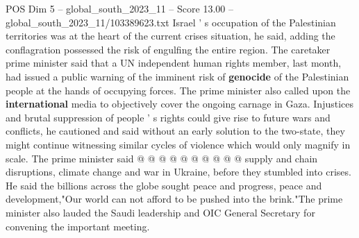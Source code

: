 \begin{textsample}{POS Dim 5 – global\_south\_2023\_11 – Score 13.00 – global\_south\_2023\_11/103389623.txt}
Israel ' s occupation of the Palestinian territories was at the heart of the current crises situation, he said, adding the conflagration possessed the risk of engulfing the entire region.
The caretaker prime minister said that a UN independent human rights member, last month, had issued a public warning of the imminent risk of \textbf{genocide} of the Palestinian people at the hands of occupying forces.
The prime minister also called upon the \textbf{international} media to objectively cover the ongoing carnage in Gaza.
Injustices and brutal suppression of people ' s rights could give rise to future wars and conflicts, he cautioned and said without an early solution to the two-state, they might continue witnessing similar cycles of violence which would only magnify in scale.
The prime minister said @ @ @ @ @ @ @ @ @ @ supply and chain disruptions, climate change and war in Ukraine, before they stumbled into crises.
He said the billions across the globe sought peace and progress, peace and development,"Our world can not afford to be pushed into the brink."The prime minister also lauded the Saudi leadership and OIC General Secretary for convening the important meeting.

\end{textsample}
